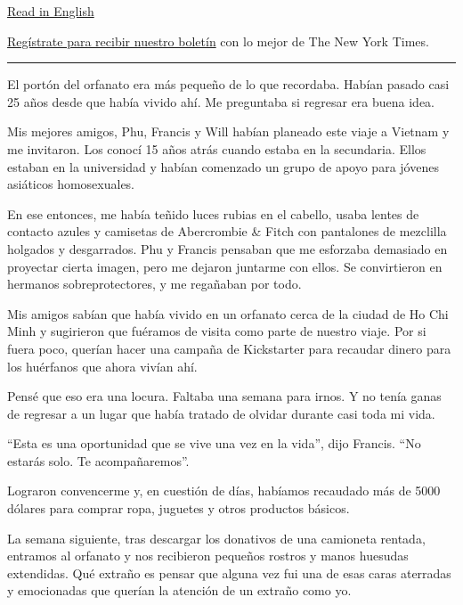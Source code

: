 \href{https://www.nytimes3xbfgragh.onion/2020/07/24/style/modern-love-adoption-vietnam-why-did-she-leave-me-there.html}{Read
in English}

\href{https://www.nytimes3xbfgragh.onion/newsletters/el-times}{Regístrate
para recibir nuestro boletín} con lo mejor de The New York Times.

\begin{center}\rule{0.5\linewidth}{\linethickness}\end{center}

El portón del orfanato era más pequeño de lo que recordaba. Habían
pasado casi 25 años desde que había vivido ahí. Me preguntaba si
regresar era buena idea.

Mis mejores amigos, Phu, Francis y Will habían planeado este viaje a
Vietnam y me invitaron. Los conocí 15 años atrás cuando estaba en la
secundaria. Ellos estaban en la universidad y habían comenzado un grupo
de apoyo para jóvenes asiáticos homosexuales.

En ese entonces, me había teñido luces rubias en el cabello, usaba
lentes de contacto azules y camisetas de Abercrombie \& Fitch con
pantalones de mezclilla holgados y desgarrados. Phu y Francis pensaban
que me esforzaba demasiado en proyectar cierta imagen, pero me dejaron
juntarme con ellos. Se convirtieron en hermanos sobreprotectores, y me
regañaban por todo.

Mis amigos sabían que había vivido en un orfanato cerca de la ciudad de
Ho Chi Minh y sugirieron que fuéramos de visita como parte de nuestro
viaje. Por si fuera poco, querían hacer una campaña de Kickstarter para
recaudar dinero para los huérfanos que ahora vivían ahí.

Pensé que eso era una locura. Faltaba una semana para irnos. Y no tenía
ganas de regresar a un lugar que había tratado de olvidar durante casi
toda mi vida.

``Esta es una oportunidad que se vive una vez en la vida'', dijo
Francis. ``No estarás solo. Te acompañaremos''.

Lograron convencerme y, en cuestión de días, habíamos recaudado más de
5000 dólares para comprar ropa, juguetes y otros productos básicos.

La semana siguiente, tras descargar los donativos de una camioneta
rentada, entramos al orfanato y nos recibieron pequeños rostros y manos
huesudas extendidas. Qué extraño es pensar que alguna vez fui una de
esas caras aterradas y emocionadas que querían la atención de un extraño
como yo.

